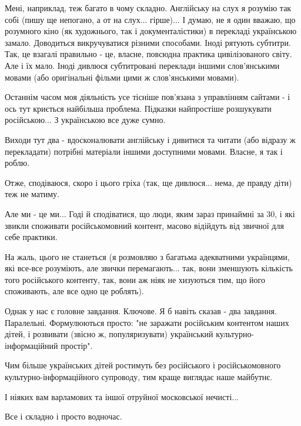 Мені, наприклад, теж багато в чому складно. Англійську на слух я розумію так
собі (пишу ще непогано, а от на слух... гірше)... І думаю, не я один вважаю, що
розумного кіно (як художнього, так і документалістики) в перекладі українською
замало. Доводиться викручуватися різними способами. Іноді рятують субтитри.
Так, це взагалі правильно - це, власне, повсюдна практика цивілізованого світу.
Але і їх мало. Іноді дивлюся субтитровані переклади іншими слов'янськими мовами
(або оригінальні фільми цими ж слов'янськими мовами).

Останнім часом моя діяльність усе тісніше пов'язана з управлінням сайтами - і
ось тут криється найбільша проблема. Підказки найпростіше розшукувати
російською... З українською все дуже сумно.

Виходи тут два - вдосконалювати англійську і дивитися та читати (або відразу ж
перекладати) потрібні матеріали іншими доступними мовами. Власне, я так і
роблю.

Отже, сподіваюся, скоро і цього гріха (так, ще дивлюся... нема, де правду діти)
теж не матиму.

Але ми - це ми... Годі й сподіватися, що люди, яким зараз принаймні за 30, і
які звикли споживати російськомовний контент, масово відійдуть від звичної для
себе практики.

На жаль, цього не станеться (я розмовляю з багатьма адекватними українцями, які
все-все розуміють, але звички перемагають... так, вони зменшують кількість того
російського контенту, так, вони аж ніяк не хизуються тим, що його споживають,
але все одно це роблять).

Однак у нас є головне завдання. Ключове. Я б навіть сказав - два завдання.
Паралельні. Формулюються просто: "не заражати російським контентом наших дітей,
і розвивати (звісно ж, популяризувати) український культурно-інформаційний
простір".

Чим більше українських дітей ростимуть без російського і російськомовного
культурно-інформаційного супроводу, тим краще виглядає наше майбутнє.

І ніяких вам варламових та іншої отруйної московської нечисті...

Все і складно і просто водночас.

